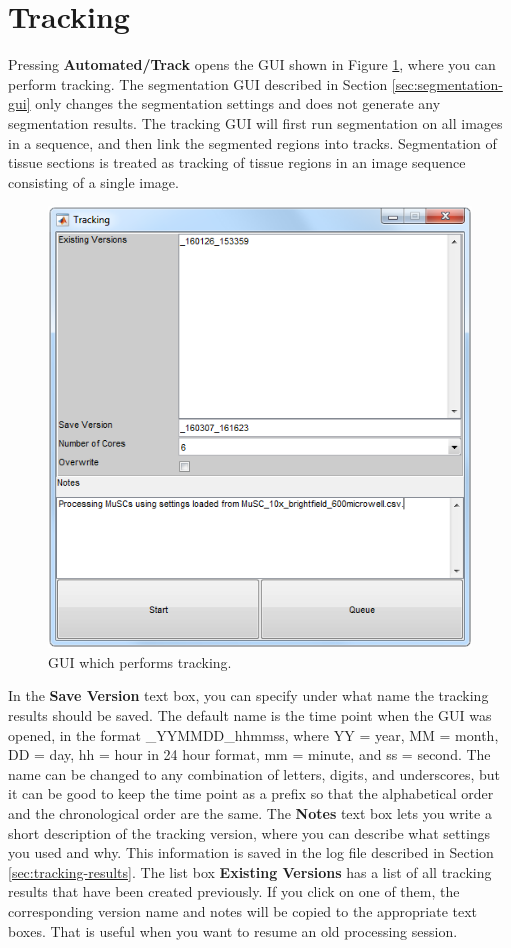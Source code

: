 \documentclass[a4paper, oneside, onecolumn, 11pt]{article}
\newcommand{\menu}[1]{\textbf{#1}}
\newcommand{\control}[1]{\textbf{#1}}
\begin{document}
\section{Tracking}
Pressing \menu{Automated/\allowbreak Track} opens the GUI shown in Figure \ref{fig:tracking-GUI}, where you can perform tracking. The segmentation GUI described in Section \ref{sec:segmentation-gui} only changes the segmentation settings and does not generate any segmentation results. The tracking GUI will first run segmentation on all images in a sequence, and then link the segmented regions into tracks. Segmentation of tissue sections is treated as tracking of tissue regions in an image sequence consisting of a single image.

\begin{figure}[!htb]
\begin{center}
\includegraphics[width = 0.5\columnwidth]{figures/trackingGUI}
\caption{GUI which performs tracking.}
\label{fig:tracking-GUI}
\end{center}
\end{figure}

In the \control{Save Version} text box, you can specify under what name the tracking results should be saved. The default name is the time point when the GUI was opened, in the format \_YYMMDD\_hhmmss, where YY = year, MM = month, DD = day, hh = hour in 24 hour format, mm = minute, and ss = second. The name can be changed to any combination of letters, digits, and underscores, but it can be good to keep the time point as a prefix so that the alphabetical order and the chronological order are the same. The \control{Notes} text box lets you write a short description of the tracking version, where you can describe what settings you used and why. This information is saved in the log file described in Section \ref{sec:tracking-results}. The list box \control{Existing Versions} has a list of all tracking results that have been created previously. If you click on one of them, the corresponding version name and notes will be copied to the appropriate text boxes. That is useful when you want to resume an old processing session.
\end{document}
